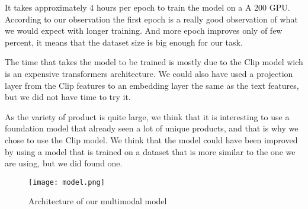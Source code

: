 It takes approximately 4 hours per epoch to train the model on a A 200 GPU. According to our observation the first epoch is a really good observation of what we would expect with longer training. And more epoch improves only of few percent, it means that the dataset size is big enough for our task.

The time that takes the model to be trained is mostly due to the Clip model wich is an expensive transformers architecture. We could also have used a projection layer from the Clip features to an embedding layer the same as the text features, but we did not have time to try it.

As the variety of product is quite large, we think that it is interesting to use a foundation model that already seen a lot of unique products, and that is why we chose to use the Clip model. We think that the model could have been improved by using a model that is trained on a dataset that is more similar to the one we are using, but we did found one.

\begin{figure}[H]
    \centering
    \texttt{[image: model.png]}
    \caption{Architecture of our multimodal model}
    \label{fig:model}
\end{figure}